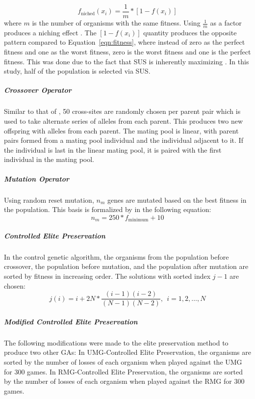 \documentclass{strrespaper-trad}
\begin{document}
						\begin{equation*}
							f_\mathrm{niched}(x_i) = \frac{1}{m} * [1 - f(x_i)]
						\end{equation*}
						where $m$ is the number of organisms with the same fitness.
						Using $\frac{1}{m}$ as a factor produces a niching effect \autocite{bhattSearchNolossStrategies2008}. 
						The $[1 - f(x_i)]$ quantity produces the opposite pattern compared to Equation~\ref{eqn:fitness}, where instead of zero as the perfect fitness and one as the worst fitness, zero is the worst fitness and one is the perfect fitness.
						This was done due to the fact that SUS is inherently maximizing \autocite{bhattSearchNolossStrategies2008}.
						In this study, half of the population is selected via SUS.
					\subparagraph{Crossover Operator}
						Similar to that of \textcite{bhattSearchNolossStrategies2008}, 50 cross-sites are randomly chosen per parent pair which is used to take alternate series of alleles from each parent.
						This produces two new offspring with alleles from each parent.
						The mating pool is linear, with parent pairs formed from a mating pool individual and the individual adjacent to it.
						If the individual is last in the linear mating pool, it is paired with the first individual in the mating pool.
					\subparagraph{Mutation Operator}
						Using random reset mutation, $n_m$ genes are mutated based on the best fitness in the population.
						This basis is formalized by \textcite{bhattSearchNolossStrategies2008} in the following equation:
						\begin{equation*}
							n_m = 250 * f_\mathrm{minimum} + 10
						\end{equation*}
					\subparagraph{Controlled Elite Preservation}
						In the control genetic algorithm, the organisms from the population before crossover, the population before mutation, and the population after mutation are sorted by fitness in increasing order.
						The solutions with sorted index $j - 1$ are chosen:
						\begin{equation*}
							j(i) = i + 2N * \frac{(i - 1)(i - 2)}{(N - 1)(N - 2)},~~i = 1, 2, \dots, N
						\end{equation*}
					\subparagraph{Modified Controlled Elite Preservation}
						The following modifications were made to the elite preservation method to produce two other GAs:
						In UMG-Controlled Elite Preservation, the organisms are sorted by the number of losses of each organism when played against the UMG for 300 games.
						In RMG-Controlled Elite Preservation, the organisms are sorted by the number of losses of each organism when played against the RMG for 300 games.
\end{document}

